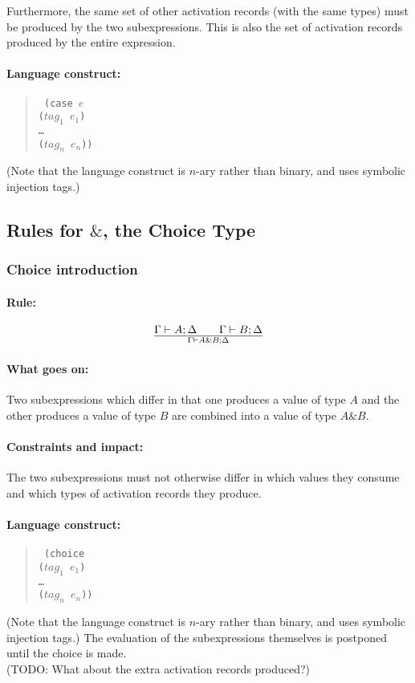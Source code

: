 \documentclass[a4paper]{article}
\begin{document}
Furthermore, the same set of other activation records (with the same
types) must be produced by the two subexpressions. This is also the
set of activation records produced by the entire expression.

\paragraph{Language construct:}
\begin{quote}\tt
  (case $e$\\
  \phantom{ }\quad ($\mathit{tag_1}$ $\mathit{e_1}$)\\
  \phantom{ }\quad \ldots\\
  \phantom{ }\quad ($\mathit{tag_n}$ $\mathit{e_n}$))
\end{quote}
(Note that the language construct is $n$-ary rather than binary, and
uses symbolic injection tags.)



\subsection{Rules for $\&$, the Choice Type}

\subsubsection{Choice introduction}

\paragraph{Rule:}
$$
{
  \Gamma \vdash A; \Delta
  \qquad
  \Gamma \vdash B; \Delta
}\over{
  \Gamma \vdash A\&B; \Delta
}
$$
\paragraph{What goes on:} Two subexpressions which differ in that one
produces a value of type $A$ and the other produces a value of type
$B$ are combined into a value of type $A\&B$.

\paragraph{Constraints and impact:} The two subexpressions must not
otherwise differ in which values they consume and which types of activation
records they produce.

\paragraph{Language construct:}
\begin{quote}\tt
  (choice\\
  \phantom{ }\quad ($\mathit{tag}_1$ $e_1$)\\
  \phantom{ }\quad \ldots\\
  \phantom{ }\quad ($\mathit{tag}_n$ $e_n$))
\end{quote}
(Note that the language construct is $n$-ary rather than binary, and
uses symbolic injection tags.)
The evaluation of the subexpressions themselves is postponed until the
choice is made.
\\(TODO: What about the extra activation records produced?)
\end{document}
